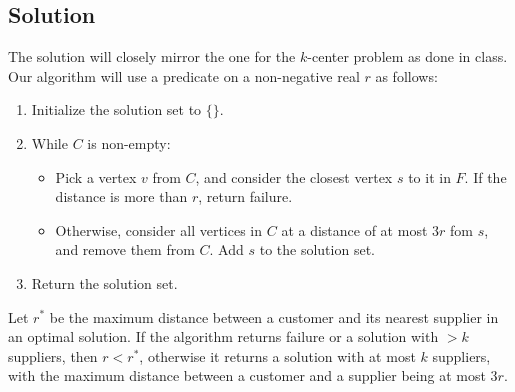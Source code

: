 \documentclass[a4paper]{article}
\newcommand{\nl}{\vspace{0.2cm}\\}
\begin{document}
\subsection{Solution}
The solution will closely mirror the one for the $k$-center problem as done in class.\nl
Our algorithm will use a predicate on a non-negative real $r$ as follows:
\begin{enumerate}
    \item Initialize the solution set to $\{\}$.
    \item While $C$ is non-empty:
        \begin{itemize}
            \item Pick a vertex $v$ from $C$, and consider the closest vertex $s$ to it in $F$. If the distance is more than $r$, return failure.
            \item Otherwise, consider all vertices in $C$ at a distance of at most $3r$ fom $s$, and remove them from $C$. Add $s$ to the solution set.
        \end{itemize}
    \item Return the solution set.
\end{enumerate}
\begin{claim}
    Let $r^*$ be the maximum distance between a customer and its nearest supplier in an optimal solution. If the algorithm returns failure or a solution with $> k$ suppliers, then $r < r^*$, otherwise it
    returns a solution with at most $k$ suppliers, with the maximum distance between a customer and a supplier being at most $3r$.
\end{claim}
\end{document}
